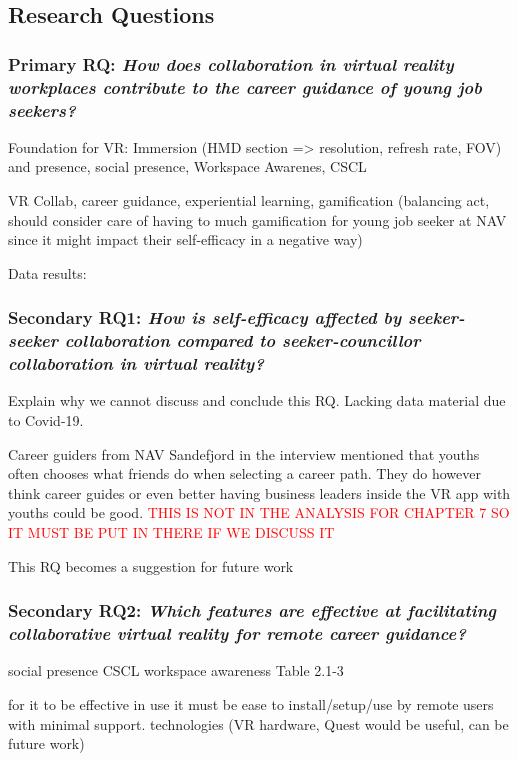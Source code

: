 \subsection{Research Questions}  
\label{RQDiscussion}

\subsubsection{Primary RQ: \textit{How does collaboration in virtual reality workplaces contribute to the career guidance of young job seekers?}} 

Foundation for VR: Immersion (HMD section => resolution, refresh rate, FOV) and presence, social presence, Workspace Awarenes, CSCL

VR Collab, career guidance, experiential learning, gamification (balancing act, should consider care of having to much gamification for young job seeker at NAV since it might impact their self-efficacy in a negative way) 

Data results: 


\subsubsection{Secondary RQ1: \textit{How is self-efficacy affected by seeker-seeker collaboration compared to seeker-councillor collaboration in virtual reality?}} 

Explain why we cannot discuss and conclude this RQ. Lacking data material due to Covid-19. 

Career guiders from NAV Sandefjord in the interview mentioned that youths often chooses what friends do when selecting a career path. They do however think career guides or even better having business leaders inside the VR app with youths could be good.
\textcolor{red}{THIS IS NOT IN THE ANALYSIS FOR CHAPTER 7 SO IT MUST BE PUT IN THERE IF WE DISCUSS IT}

This RQ becomes a suggestion for future work


\subsubsection{Secondary RQ2: \textit{Which features are effective at facilitating collaborative virtual reality for remote
career guidance?}} 

social presence
CSCL
workspace awareness
Table 2.1-3

for it to be effective in use it must be ease to install/setup/use by remote users with minimal support. technologies (VR hardware, Quest would be useful, can be future work)

